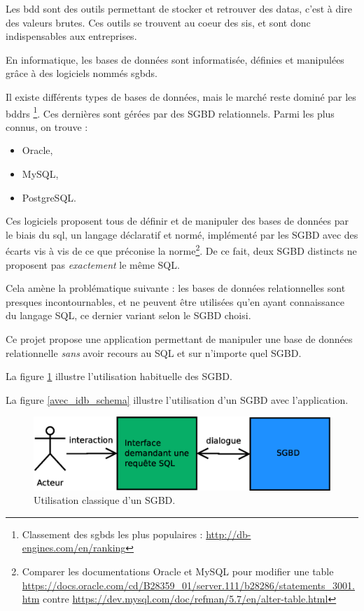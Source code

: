 Les \gls{bdd} sont des outils permettant de stocker et retrouver des \glspl{data}, c'est à dire des valeurs brutes. Ces outils se trouvent au coeur des \glspl{si}, et sont donc indispensables aux entreprises.

En informatique, les bases de données sont informatisée, définies et manipulées grâce à des logiciels nommés \glspl{sgbd}.

Il existe différents types de bases de données, mais le marché reste dominé par les \glspl{bddr} \footnote{\label{part_de_marché_relationnel}Classement des \glspl{sgbd} les plus populaires : \url{http://db-engines.com/en/ranking}}. Ces dernières sont gérées par des SGBD relationnels. Parmi les plus connus, on trouve :
\begin{itemize}
\item Oracle,
\item MySQL,
\item PostgreSQL.\\
\end{itemize}

Ces logiciels proposent tous de définir et de manipuler des bases de données par le biais du \gls{sql}, un langage déclaratif et normé, implémenté par les SGBD avec des écarts vis à vis de ce que préconise la norme\footnote{\label{differences_implementation_sql_sqgbd}Comparer les documentations Oracle et MySQL pour modifier une table \url{https://docs.oracle.com/cd/B28359_01/server.111/b28286/statements_3001.htm} contre \url{https://dev.mysql.com/doc/refman/5.7/en/alter-table.html}}. De ce fait, deux SGBD distincts ne proposent pas \textit{exactement} le même SQL.

Cela amène la problématique suivante : les bases de données relationnelles sont presques incontournables, et ne peuvent être utilisées qu'en ayant connaissance du langage SQL, ce dernier variant selon le SGBD choisi. 

Ce projet propose une application permettant de manipuler une base de données relationnelle \textit{sans} avoir recours au SQL et sur n'importe quel SGBD.

La figure \ref{sans_idb_schema} illustre l'utilisation habituelle des SGBD.

La figure \ref{avec_idb_schema} illustre l'utilisation d'un SGBD avec l'application.

\begin{figure}[!h]
  \centering
  \includegraphics[width=14cm]{images/sans_idb.eps}
  \caption{Utilisation classique d'un SGBD.}
  \label{sans_idb_schema}
\end{figure}

